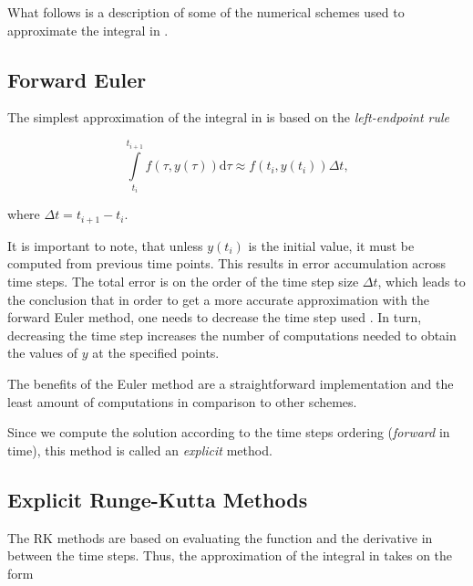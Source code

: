 What follows is a description of some of the numerical schemes used to approximate the integral in .

\subsection{Forward Euler}
\label{subsection:forward_euler}

The simplest approximation of the integral in  is based on the \emph{left-endpoint rule} \cite{Gockenbach2011}

\begin{equation}
  \int \limits_{t_i}^{t_{i+1}} f(\tau, y(\tau)) \mathrm{d} \tau \approx f(t_i, y(t_i))\Delta t,
  \label{eq:forward_euler}
\end{equation}

where $\Delta t = t_{i+1} - t_i$.

It is important to note, that unless $y(t_i)$ is the initial value, it must be computed from previous time points. This results in error accumulation across time steps. The total error is on the order of the time step size $\Delta t$, which leads to the conclusion that in order to get a more accurate approximation with the forward Euler method, one needs to decrease the time step used \cite{Gockenbach2011}. In turn, decreasing the time step increases the number of computations needed to obtain the values of $y$ at the specified points.

The benefits of the Euler method are a straightforward implementation and the least amount of computations in comparison to other schemes.

Since we compute the solution according to the time steps ordering (\emph{forward} in time), this method is called an \emph{explicit} method.

\subsection{Explicit Runge-Kutta Methods}
\label{subsection:runge_kutta_methods}

The \ac{RK} methods are based on evaluating the function and the derivative in between the time steps. Thus, the approximation of the integral in  takes on the form \cite{Gockenbach2011}


